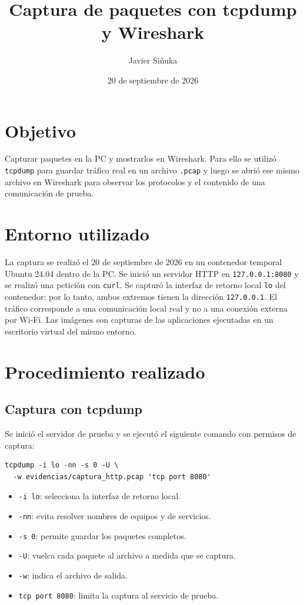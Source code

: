 \documentclass[11pt,a4paper]{article}
\title{Captura de paquetes con tcpdump y Wireshark}
\author{Javier Siñuka}
\date{20 de septiembre de 2026}
\begin{document}
\maketitle

\section{Objetivo}

Capturar paquetes en la PC y mostrarlos en Wireshark. Para ello se utilizó
\texttt{tcpdump} para guardar tráfico real en un archivo \texttt{.pcap} y luego
se abrió ese mismo archivo en Wireshark para observar los protocolos y el
contenido de una comunicación de prueba.

\section{Entorno utilizado}

La captura se realizó el 20 de septiembre de 2026 en un contenedor temporal
Ubuntu 24.04 dentro de la PC.
Se inició un servidor HTTP en \texttt{127.0.0.1:8080} y se realizó una petición
con \texttt{curl}. Se capturó la interfaz de retorno local \texttt{lo} del
contenedor: por lo tanto, ambos extremos tienen la dirección
\texttt{127.0.0.1}. El tráfico corresponde a una comunicación local real y no
a una conexión externa por Wi-Fi. Las imágenes son capturas de las aplicaciones
ejecutadas en un escritorio virtual del mismo entorno.

\section{Procedimiento realizado}

\subsection{Captura con tcpdump}

Se inició el servidor de prueba y se ejecutó el siguiente comando con permisos
de captura:

\begin{verbatim}
tcpdump -i lo -nn -s 0 -U \
  -w evidencias/captura_http.pcap 'tcp port 8080'
\end{verbatim}

\begin{itemize}[noitemsep]
    \item \texttt{-i lo}: selecciona la interfaz de retorno local.
    \item \texttt{-nn}: evita resolver nombres de equipos y de servicios.
    \item \texttt{-s 0}: permite guardar los paquetes completos.
    \item \texttt{-U}: vuelca cada paquete al archivo a medida que se captura.
    \item \texttt{-w}: indica el archivo de salida.
    \item \texttt{tcp port 8080}: limita la captura al servicio de prueba.
\end{itemize}
\end{document}
